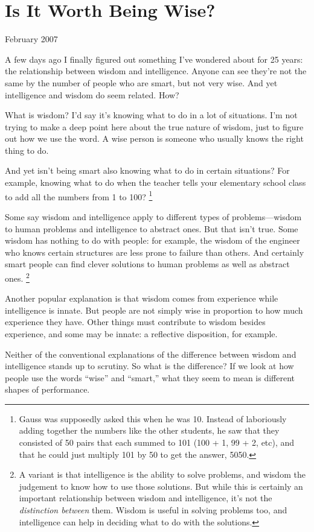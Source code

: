 \chapter{Is It Worth Being Wise?}

February 2007

A few days ago I finally figured out something I've wondered about for
25 years: the relationship between wisdom and intelligence. Anyone can
see they're not the same by the number of people who are smart, but not
very wise. And yet intelligence and wisdom do seem related. How?

What is wisdom? I'd say it's knowing what to do in a lot of situations.
I'm not trying to make a deep point here about the true nature of
wisdom, just to figure out how we use the word. A wise person is someone
who usually knows the right thing to do.

And yet isn't being smart also knowing what to do in certain situations?
For example, knowing what to do when the teacher tells your elementary
school class to add all the numbers from 1 to 100?
\footnote{Gauss was supposedly asked this when he was 10. Instead of
laboriously adding together the numbers like the other students, he saw
that they consisted of 50 pairs that each summed to 101 (100 + 1, 99 +
2, etc), and that he could just multiply 101 by 50 to get the answer,
5050.}

Some say wisdom and intelligence apply to different types of
problems---wisdom to human problems and intelligence to abstract ones.
But that isn't true. Some wisdom has nothing to do with people: for
example, the wisdom of the engineer who knows certain structures are
less prone to failure than others. And certainly smart people can find
clever solutions to human problems as well as abstract ones.
\footnote{A variant is that intelligence is the ability to solve problems,
and wisdom the judgement to know how to use those solutions. But while
this is certainly an important relationship between wisdom and
intelligence, it's not the \emph{distinction between} them. Wisdom is
useful in solving problems too, and intelligence can help in deciding
what to do with the solutions.}

Another popular explanation is that wisdom comes from experience while
intelligence is innate. But people are not simply wise in proportion to
how much experience they have. Other things must contribute to wisdom
besides experience, and some may be innate: a reflective disposition,
for example.

Neither of the conventional explanations of the difference between
wisdom and intelligence stands up to scrutiny. So what is the
difference? If we look at how people use the words ``wise'' and
``smart,'' what they seem to mean is different shapes of performance.


